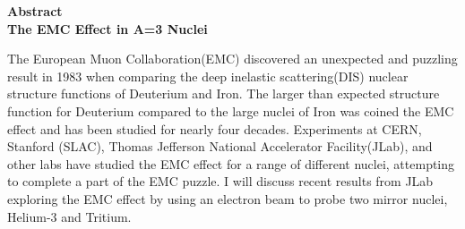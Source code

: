 \begin{center}
	{\large \textbf{Abstract}}\\
	
	{\large \textbf{The EMC Effect in A=3 Nuclei}}\\
\end{center}

The European Muon Collaboration(EMC) discovered an unexpected and puzzling result in 1983 when comparing the deep inelastic scattering(DIS) nuclear structure functions of Deuterium and Iron. The larger than expected structure function for Deuterium compared to the large nuclei of  Iron was coined the EMC effect and has been studied for near\textsc{}ly four decades. Experiments at CERN, Stanford (SLAC), Thomas Jefferson National Accelerator Facility(JLab), and other labs have studied the EMC effect for a range of different nuclei, attempting to complete a part of the EMC puzzle. I will discuss recent results from JLab exploring the EMC effect by using an electron beam to probe two mirror nuclei, Helium-3 and Tritium. 
